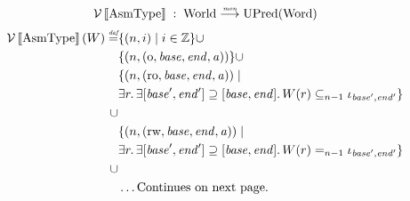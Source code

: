 \documentclass{article}
\newcommand{\update}[2]{[#1 \mapsto #2]}
\newcommand{\sem}[1]{\left\llbracket #1 \right\rrbracket}
\newcommand{\monfun}{\stackrel{\textit{\tiny{mon}}}{\longrightarrow}}
\newcommand{\defeq}{\stackrel{\textit{\tiny{def}}}{=}}
\newcommand{\union}{\mathbin{\cup}}
\DeclareMathOperator{\dom}{dom}
\newcommand{\var}[1]{\mathit{#1}}
\newcommand{\addr}{\var{a}}
\newcommand{\start}{\var{base}}
\newcommand{\addrend}{\var{end}}
\newcommand{\heapseg}{\var{hs}}
\newcommand{\heap}{\var{heap}}
\newcommand{\perm}{\var{perm}}
\newcommand{\stdcap}[1][\perm]{\left(#1,\start,\addrend,\addr \right)}
\newcommand{\plainproj}[1]{\mathrm{#1}}
\newcommand{\memheap}[1][\Phi]{#1.\plainproj{heap}}
\newcommand{\future}{\mathbin{\sqsupseteq}}
\newcommand{\heapSat}[3][\heap]{#1 :_{#2} #3}
\newcommand{\asmType}{\plaindom{AsmType}}
\newcommand{\plaindom}[1]{\mathrm{#1}}
\newcommand{\Words}{\plaindom{Word}}
\newcommand{\ints}{\mathbb{Z}}
\newcommand{\RegionName}{\plaindom{RegionName}}
\newcommand{\Worlds}{\plaindom{World}}
\newcommand{\UPred}[1]{\plaindom{UPred}(#1)}
\newcommand{\intr}[2]{\mathcal{#1}\sem{#2}}
\newcommand{\valueintr}[1]{\intr{V}{#1}}
\newcommand{\stdvr}{\valueintr{\asmType}}
\newcommand{\npair}[2][n]{\left(#1,#2 \right)}
\newcommand{\plainperm}[1]{\mathrm{#1}}
\newcommand{\noperm}{\plainperm{o}}
\newcommand{\readonly}{\plainperm{ro}}
\newcommand{\readwrite}{\plainperm{rw}}
\begin{document}
\[
\stdvr \; : \;  \Worlds \monfun \UPred{\Words}
\]
\begin{align*}
  \stdvr(W) \defeq & \{ \npair{i} \mid i \in \ints \} 
\union \\
                   & \{ \npair{\stdcap[\noperm] } \} 
\union \\
                   & \{ \npair{\stdcap[\readonly] } \mid \\
                   & \exists r \ldotp \exists [\start',\addrend'] \supseteq [\start,\addrend] \ldotp W(r) \subseteq_{n-1} \iota_{\start',\addrend'} \}\\
\union \\
                   & \{ \npair{\stdcap[\readwrite] } \mid \\
                   & \exists r \ldotp \exists [\start',\addrend'] \supseteq [\start,\addrend] \ldotp W(r) =_{n-1} \iota_{\start',\addrend'} \} \\
\union \\
                   & \dots\text{Continues on next page.}
\end{align*}
\end{document}

